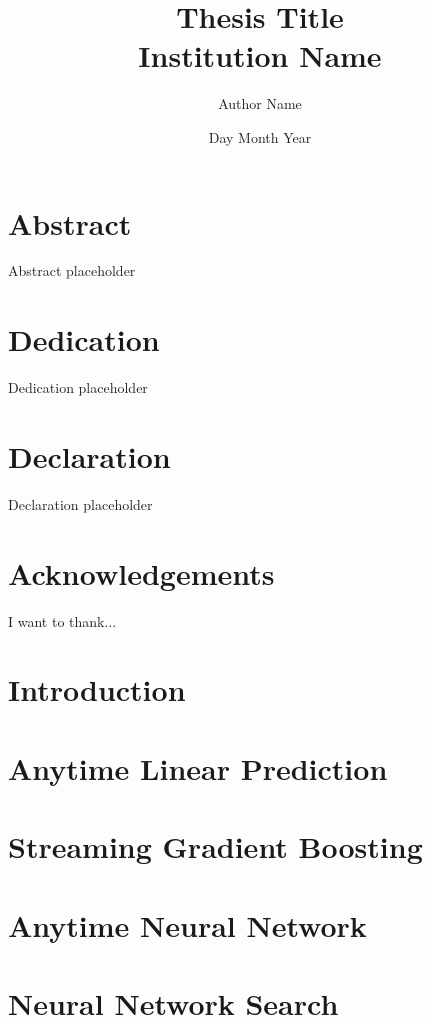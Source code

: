 \documentclass[]{report}
\title{
{Thesis Title}\\
{\large Institution Name}
}
\author{Author Name}
\date{Day Month Year}
\newcommand{\GOMPDIR}{1_gomp}
\newcommand{\SGBDIR}{2_sgb}
\newcommand{\ANNDIR}{3_ann}
\newcommand{\NASDIR}{4_nas}
\begin{document}
\maketitle


\chapter*{Abstract}
Abstract placeholder

\chapter*{Dedication}
Dedication placeholder

\chapter*{Declaration}
Declaration placeholder

\chapter*{Acknowledgements}
I want to thank...

\tableofcontents

\linenumbers
\chapter{Introduction}


\chapter{Anytime Linear Prediction}


\chapter{Streaming Gradient Boosting}


\chapter{Anytime Neural Network}


\chapter{Neural Network Search}

\end{document}
